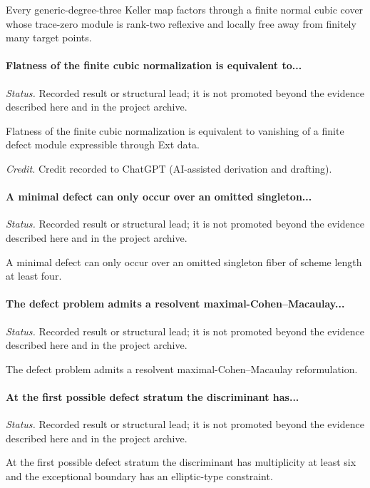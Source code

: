 Every generic-degree-three Keller map factors through a finite normal cubic cover whose trace-zero module is rank-two reflexive and locally free away from finitely many target points.

\label{supp-note-01-007}
\paragraph{Flatness of the finite cubic normalization is equivalent to...}
\emph{Status.} Recorded result or structural lead; it is not promoted beyond the evidence described here and in the project archive.

Flatness of the finite cubic normalization is equivalent to vanishing of a finite defect module expressible through Ext data.

\emph{Credit.} Credit recorded to ChatGPT (AI-assisted derivation and drafting).

\label{supp-note-01-008}
\paragraph{A minimal defect can only occur over an omitted singleton...}
\emph{Status.} Recorded result or structural lead; it is not promoted beyond the evidence described here and in the project archive.

A minimal defect can only occur over an omitted singleton fiber of scheme length at least four.

\label{supp-note-01-009}
\paragraph{The defect problem admits a resolvent maximal-Cohen--Macaulay...}
\emph{Status.} Recorded result or structural lead; it is not promoted beyond the evidence described here and in the project archive.

The defect problem admits a resolvent maximal-Cohen--Macaulay reformulation.

\label{supp-note-01-010}
\paragraph{At the first possible defect stratum the discriminant has...}
\emph{Status.} Recorded result or structural lead; it is not promoted beyond the evidence described here and in the project archive.

At the first possible defect stratum the discriminant has multiplicity at least six and the exceptional boundary has an elliptic-type constraint.

